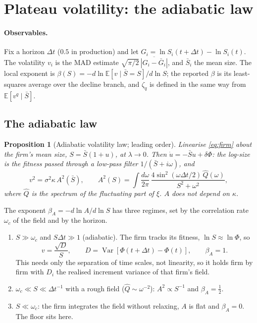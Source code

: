 \documentclass[11pt]{article}
\newcommand{\E}{\mathbb E}
\newcommand{\Var}{\operatorname{Var}}
\newtheorem{proposition}{Proposition}
\begin{document}
\section{Plateau volatility: the adiabatic law}
\label{sec:adiabatic}

\paragraph{Observables.}
Fix a horizon $\Delta t$ ($0.5$ in production) and let $G_i=\ln S_i(t+\Delta t)-\ln S_i(t)$.  The
volatility $v_i$ is the MAD estimate $\sqrt{\pi/2}\,\overline{|G_i-\bar G_i|}$, and $\bar S_i$ the
mean size.  The local exponent is $\beta(S)=-d\ln\E[v\mid\bar S=S]/d\ln S$; the reported $\beta$ is
its least-squares average over the decline branch, and $\zeta_q$ is defined in the same way from
$\E[v^q\mid\bar S]$.

\subsection{The adiabatic law}
\label{sec:adlaw}

\begin{proposition}[Adiabatic volatility law; leading order]\label{prop:adiabatic}
Linearise \eqref{eq:firm} about the firm's mean size, $S=\bar S(1+u)$, at $\lambda\to0$.  Then
$\dot u=-\bar Su+\delta\Phi$: the log-size is the fitness passed through a low-pass filter
$1/(\bar S+i\omega)$, and
\begin{equation}
  v^2=\sigma^2\kappa\,A^2(\bar S),\qquad
  A^2(S)=\int\frac{d\omega}{2\pi}\,\frac{4\sin^2(\omega\Delta t/2)\,\widehat Q(\omega)}{S^2+\omega^2},
  \label{eq:A}
\end{equation}
where $\widehat Q$ is the spectrum of the fluctuating part of $\xi$.  $A$ does not depend on
$\kappa$.
\end{proposition}
The exponent $\beta_A=-d\ln A/d\ln S$ has three regimes, set by the correlation rate $\omega_c$
of the field and by the horizon.
\begin{enumerate}
  \item $S\gg\omega_c$ and $S\Delta t\gg1$ (adiabatic).  The firm tracks its fitness,
        $\ln S\approx\ln\Phi$, so
        \begin{equation}
          v=\frac{\sqrt D}{S},\qquad D=\Var[\Phi(t+\Delta t)-\Phi(t)],\qquad\beta_A=1 .
          \label{eq:adlimit}
        \end{equation}
        This needs only the separation of time scales, not linearity, so it holds firm by firm
        with $D_i$ the realised increment variance of that firm's field.
  \item $\omega_c\ll S\ll\Delta t^{-1}$ with a rough field ($\widehat Q\sim\omega^{-2}$):
        $A^2\propto S^{-1}$ and $\beta_A=\tfrac12$.
  \item $S\ll\omega_c$: the firm integrates the field without relaxing, $A$ is flat and
        $\beta_A=0$.  The floor sits here.
\end{enumerate}
\end{document}

